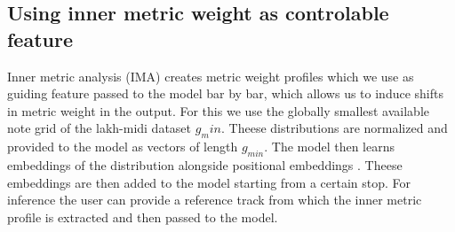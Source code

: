 \subsection{Using inner metric weight as controlable feature}
Inner metric analysis (IMA) creates metric weight profiles which we use as guiding feature passed to the model bar by bar, which allows us to induce shifts in metric weight in the output. 
For this we use the globally smallest available note grid of the lakh-midi dataset $g_min$. Theese distributions are normalized and provided to the model as vectors of length $g_{min}$.
The model then learns embeddings of the distribution alongside positional embeddings \cite{Lin_cocomulla_2024}. Theese embeddings are then added to the model starting from a certain stop.
For inference the user can provide a reference track from which the inner metric profile is extracted and then passed to the model. 
